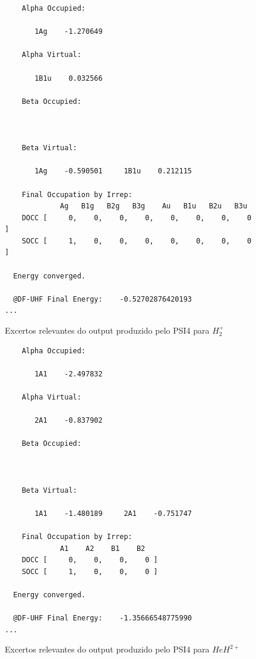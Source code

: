 \documentclass[portuguese,]{article}
\begin{document}
\begin{figure}[htb]
\begin{lstlisting}
    Alpha Occupied:                                                       

       1Ag    -1.270649  

    Alpha Virtual:                                                        

       1B1u    0.032566  

    Beta Occupied:                                                        

    

    Beta Virtual:                                                         

       1Ag    -0.590501     1B1u    0.212115  

    Final Occupation by Irrep:
             Ag   B1g   B2g   B3g    Au   B1u   B2u   B3u 
    DOCC [     0,    0,    0,    0,    0,    0,    0,    0 ]
    SOCC [     1,    0,    0,    0,    0,    0,    0,    0 ]

  Energy converged.

  @DF-UHF Final Energy:    -0.52702876420193
...
\end{lstlisting}
\caption{Excertos relevantes do output produzido pelo PSI4 para $H_2^+$}
\label{output:Hion}
\end{figure}

\begin{figure}[htb]
\begin{lstlisting}
    Alpha Occupied:                                                       

       1A1    -2.497832  

    Alpha Virtual:                                                        

       2A1    -0.837902  

    Beta Occupied:                                                        

    

    Beta Virtual:                                                         

       1A1    -1.480189     2A1    -0.751747  

    Final Occupation by Irrep:
             A1    A2    B1    B2 
    DOCC [     0,    0,    0,    0 ]
    SOCC [     1,    0,    0,    0 ]

  Energy converged.

  @DF-UHF Final Energy:    -1.35666548775990
...
\end{lstlisting}
\caption{Excertos relevantes do output produzido pelo PSI4 para $HeH^{2+}$}
\label{output:HeHion}
\end{figure}
\end{document}
